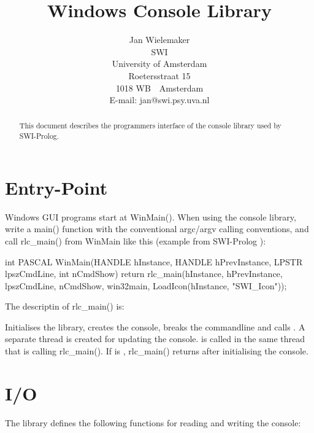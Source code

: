 \documentclass[11pt]{article}
\title{Windows Console Library}
\author{Jan Wielemaker \\
	SWI \\
	University of Amsterdam \\
	Roetersstraat 15 \\
	1018 WB~~Amsterdam \\
	E-mail: jan@swi.psy.uva.nl}
\begin{document}
\maketitle

\begin{abstract}
This document describes the programmers interface of the console library
used by SWI-Prolog.
\end{abstract}

\section{Entry-Point}

Windows GUI programs start at WinMain(). When using the console library,
write a main() function with the conventional argc/argv calling
conventions, and call rlc_main() from WinMain like this (example
from SWI-Prolog ):

\begin{code}
int PASCAL
WinMain(HANDLE hInstance, HANDLE hPrevInstance,
	LPSTR lpszCmdLine, int nCmdShow)
{ return rlc_main(hInstance, hPrevInstance, lpszCmdLine, nCmdShow,
		  win32main, LoadIcon(hInstance, "SWI_Icon"));
}
\end{code}

The descriptin of rlc_main() is:

\begin{description}
Initialises the library, creates the console, breaks the commandline
and calls .  A separate thread is created for updating
the console.   is called in the same thread that is
calling rlc_main().  If  is , rlc_main()
returns after initialising the console.
\end{description}

\section{I/O}

The library defines the following functions for reading and writing the
console:
\end{document}
